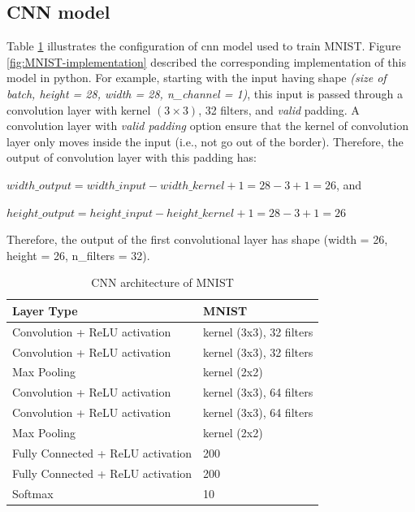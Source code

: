\documentclass[12pt]{article}
\begin{document}

\subsection{CNN model}
Table \ref{tab:CNN-architecture-MNIST} illustrates the configuration of \gls{cnn} model used to train MNIST. Figure \ref{fig:MNIST-implementation} described the corresponding implementation of this model in python. For example, starting with the input having shape \textit{(size of batch, height = 28, width = 28, n\_channel = 1)}, this input is passed through a convolution layer with kernel $(3 \times 3)$, 32 filters, and \textit{valid} padding. A convolution layer with \textit{valid padding} option ensure that the kernel of convolution layer only moves inside the input (i.e., not go out of the border). Therefore, the output of convolution layer with this padding has:
\begin{center}
	$width\_output = width\_input - width\_kernel + 1 = 28 - 3 + 1 = 26$, and
	
	$height\_output = height\_input - height\_kernel + 1  = 28 - 3 + 1 = 26$
\end{center}

Therefore, the output of the first convolutional layer has shape (width = 26, height = 26, n\_filters = 32).


\begin{table}[H]
	\centering
	\small
	\caption{CNN architecture of MNIST}
	\vspace{6mm}
	\label{tab:CNN-architecture-MNIST}
	\begin{tabular}{|l|l|}
		\hline
		\textbf{Layer Type} & \textbf{MNIST} \\ \hline
		Convolution + ReLU activation & kernel (3x3), 32 filters \\ \hline
		Convolution + ReLU activation & kernel (3x3), 32 filters \\ \hline
		Max Pooling & kernel (2x2) \\ \hline
		Convolution + ReLU activation & kernel (3x3), 64 filters \\ \hline
		Convolution + ReLU activation & kernel (3x3), 64 filters \\ \hline
		Max Pooling & kernel (2x2) \\ \hline
		Fully Connected + ReLU activation & 200 \\ \hline
		Fully Connected + ReLU activation & 200 \\ \hline
		Softmax & 10 \\ \hline
	\end{tabular}%
\end{table}
\end{document}
